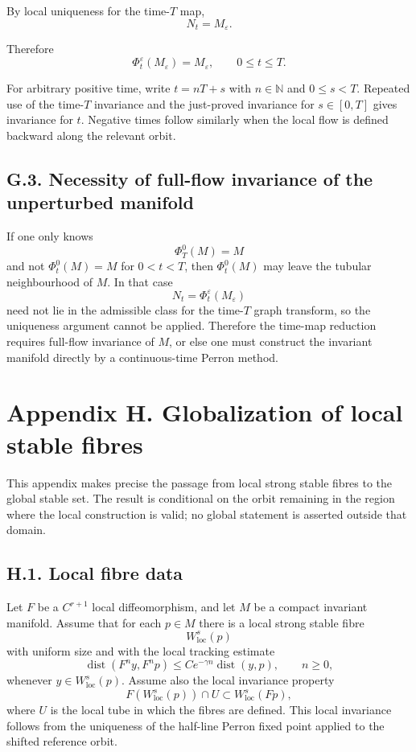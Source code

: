 \documentclass[12pt,a4paper]{article}
\theoremstyle{plain}
\numberwithin{equation}{section}
\numberwithin{theorem}{section}
\begin{document}
By local uniqueness for the time-$T$ map,
\[
N_t=M_\varepsilon.
\]

Therefore
\[
\Phi_t^\varepsilon(M_\varepsilon)=M_\varepsilon,
\qquad 0\le t\le T.
\]

For arbitrary positive time, write $t=nT+s$ with $n\in\mathbb N$ and $0\le s<T$. Repeated use of the time-$T$ invariance and the just-proved invariance for $s\in[0,T]$ gives invariance for $t$. Negative times follow similarly when the local flow is defined backward along the relevant orbit.

\subsection{G.3. Necessity of full-flow invariance of the unperturbed manifold}

If one only knows
\[
\Phi_T^0(M)=M
\]
and not $\Phi_t^0(M)=M$ for $0<t<T$, then $\Phi_t^0(M)$ may leave the tubular neighbourhood of $M$. In that case
\[
N_t=\Phi_t^\varepsilon(M_\varepsilon)
\]
need not lie in the admissible class for the time-$T$ graph transform, so the uniqueness argument cannot be applied. Therefore the time-map reduction requires full-flow invariance of $M$, or else one must construct the invariant manifold directly by a continuous-time Perron method.

\clearpage

\section{Appendix H. Globalization of local stable fibres}

This appendix makes precise the passage from local strong stable fibres to the global stable set. The result is conditional on the orbit remaining in the region where the local construction is valid; no global statement is asserted outside that domain.

\subsection{H.1. Local fibre data}

Let $F$ be a $C^{r+1}$ local diffeomorphism, and let $M$ be a compact invariant manifold. Assume that for each $p\in M$ there is a local strong stable fibre
\[
W^s_{\mathrm{loc}}(p)
\]
with uniform size and with the local tracking estimate
\[
\operatorname{dist}(F^n y,F^n p)
\le
C e^{-\gamma n}\operatorname{dist}(y,p),
\qquad n\ge0,
\]
whenever $y\in W^s_{\mathrm{loc}}(p)$. Assume also the local invariance property
\[
F(W^s_{\mathrm{loc}}(p))
\cap U
\subset
W^s_{\mathrm{loc}}(Fp),
\]
where $U$ is the local tube in which the fibres are defined. This local invariance follows from the uniqueness of the half-line Perron fixed point applied to the shifted reference orbit.
\end{document}
